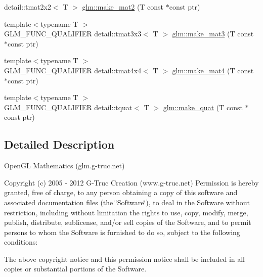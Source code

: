 \begin{DoxyCompactItemize}
detail\-::tmat2x2$<$ \-T $>$ \hyperlink{group__gtc__type__ptr_ga1cd3c7e8207ad835a1f86c12b5f0e4ad}{glm\-::make\-\_\-mat2} (\-T const $\ast$const ptr)
\item 
{\footnotesize template$<$typename T $>$ }\\\-G\-L\-M\-\_\-\-F\-U\-N\-C\-\_\-\-Q\-U\-A\-L\-I\-F\-I\-E\-R \*
detail\-::tmat3x3$<$ \-T $>$ \hyperlink{group__gtc__type__ptr_gac6e0eaaceaf9652ccad60c429e6c827f}{glm\-::make\-\_\-mat3} (\-T const $\ast$const ptr)
\item 
{\footnotesize template$<$typename T $>$ }\\\-G\-L\-M\-\_\-\-F\-U\-N\-C\-\_\-\-Q\-U\-A\-L\-I\-F\-I\-E\-R \*
detail\-::tmat4x4$<$ \-T $>$ \hyperlink{group__gtc__type__ptr_ga35786a6758c046ef15fc4c03ae974861}{glm\-::make\-\_\-mat4} (\-T const $\ast$const ptr)
\item 
{\footnotesize template$<$typename T $>$ }\\\-G\-L\-M\-\_\-\-F\-U\-N\-C\-\_\-\-Q\-U\-A\-L\-I\-F\-I\-E\-R \*
detail\-::tquat$<$ \-T $>$ \hyperlink{group__gtc__type__ptr_ga74d6da8815bc118fdf18c78f739f59e9}{glm\-::make\-\_\-quat} (\-T const $\ast$const ptr)
\end{DoxyCompactItemize}


\subsection{\-Detailed \-Description}
\-Open\-G\-L \-Mathematics (glm.\-g-\/truc.\-net)

\-Copyright (c) 2005 -\/ 2012 \-G-\/\-Truc \-Creation (www.\-g-\/truc.\-net) \-Permission is hereby granted, free of charge, to any person obtaining a copy of this software and associated documentation files (the \char`\"{}\-Software\char`\"{}), to deal in the \-Software without restriction, including without limitation the rights to use, copy, modify, merge, publish, distribute, sublicense, and/or sell copies of the \-Software, and to permit persons to whom the \-Software is furnished to do so, subject to the following conditions\-:

\-The above copyright notice and this permission notice shall be included in all copies or substantial portions of the \-Software.

